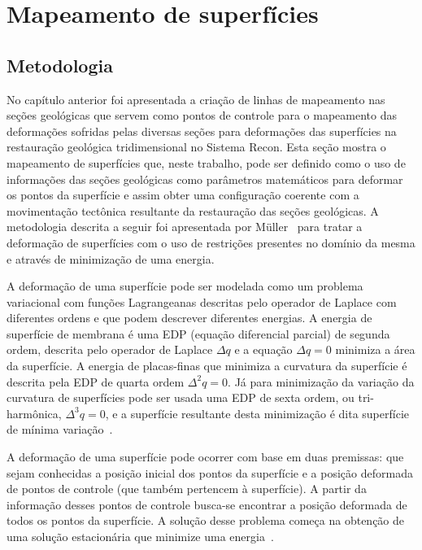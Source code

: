 
\chapter{Mapeamento de superfícies}

\section{Metodologia}\label{surface-mapping-metodology}

No capítulo anterior foi apresentada a criação de linhas de mapeamento nas seções geológicas que servem como pontos de controle para o mapeamento das deformações sofridas pelas diversas seções para deformações das superfícies na restauração geológica tridimensional no Sistema Recon. Esta seção mostra o mapeamento de superfícies que, neste trabalho, pode ser definido como o uso de informações das seções geológicas como parâmetros matemáticos para deformar os pontos da superfície e assim obter uma configuração coerente com a movimentação tectônica resultante da restauração das seções geológicas. A metodologia descrita a seguir foi apresentada por Müller~\cite{Muller} para tratar a deformação de superfícies com o uso de restrições presentes no domínio da mesma e através de minimização de uma energia.

A deformação de uma superfície pode ser modelada como um problema variacional com funções Lagrangeanas descritas pelo operador de Laplace com diferentes ordens e que podem descrever diferentes energias. A energia de superfície de membrana é uma EDP (equação diferencial parcial) de segunda ordem, descrita pelo operador de Laplace $\Delta{q}$ e a equação $\Delta{q}=0$ minimiza a área da superfície. A energia de placas-finas que minimiza a curvatura da superfície é descrita pela EDP de quarta ordem $\Delta^2{q}=0$. Já para minimização da variação da curvatura de superfícies pode ser usada uma EDP de sexta ordem, ou tri-harmônica, $\Delta^3{q}=0$, e a superfície resultante desta minimização é dita superfície de mínima variação~\cite{Muller, Botsch}.

A deformação de uma superfície pode ocorrer com base em duas premissas: que sejam conhecidas a posição inicial dos pontos da superfície e a posição deformada de pontos de controle (que também pertencem à superfície). A partir da informação desses pontos de controle busca-se encontrar a posição deformada de todos os pontos da superfície. A solução desse problema começa na obtenção de uma solução estacionária que minimize uma energia~\cite{Muller}.

